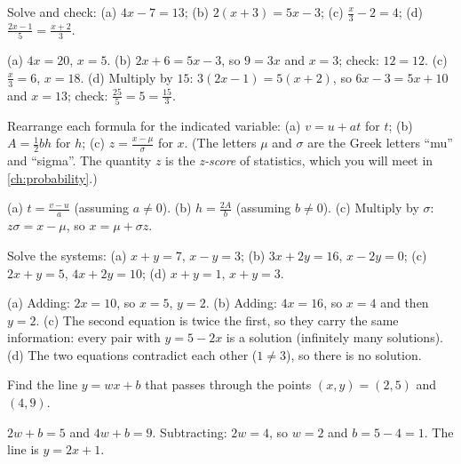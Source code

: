 \sectionexercises

\begin{exercise}
Solve and check: (a) $4x - 7 = 13$; (b) $2(x+3) = 5x - 3$;
(c) $\tfrac{x}{3} - 2 = 4$; (d) $\tfrac{2x-1}{5} = \tfrac{x+2}{3}$.
\end{exercise}
\begin{solution}
(a) $4x = 20$, $x = 5$.
(b) $2x + 6 = 5x - 3$, so $9 = 3x$ and $x = 3$; check: $12 = 12$.
(c) $\tfrac{x}{3} = 6$, $x = 18$.
(d) Multiply by $15$: $3(2x - 1) = 5(x + 2)$, so $6x - 3 = 5x + 10$ and
$x = 13$; check: $\tfrac{25}{5} = 5 = \tfrac{15}{3}$.
\end{solution}

\begin{exercise}
Rearrange each formula for the indicated variable: (a) $v = u + at$ for $t$;
(b) $A = \tfrac12 bh$ for $h$; (c) $z = \tfrac{x - \mu}{\sigma}$ for $x$.
(The letters $\mu$ and $\sigma$ are the Greek letters ``mu'' and ``sigma''.
The quantity $z$ is the \emph{z-score} of statistics, which you will meet in
\cref{ch:probability}.)
\end{exercise}
\begin{solution}
(a) $t = \tfrac{v - u}{a}$ (assuming $a \neq 0$).
(b) $h = \tfrac{2A}{b}$ (assuming $b \neq 0$).
(c) Multiply by $\sigma$: $z\sigma = x - \mu$, so $x = \mu + \sigma z$.
\end{solution}

\begin{exercise}
Solve the systems: (a) $x + y = 7$, $x - y = 3$; (b) $3x + 2y = 16$,
$x - 2y = 0$; (c) $2x + y = 5$, $4x + 2y = 10$; (d) $x + y = 1$,
$x + y = 3$.
\end{exercise}
\begin{solution}
(a) Adding: $2x = 10$, so $x = 5$, $y = 2$.
(b) Adding: $4x = 16$, so $x = 4$ and then $y = 2$.
(c) The second equation is twice the first, so they carry the same
information: every pair with $y = 5 - 2x$ is a solution (infinitely many
solutions).
(d) The two equations contradict each other ($1 \neq 3$), so there is no
solution.
\end{solution}

\begin{exercise}
Find the line $y = wx + b$ that passes through the points $(x,y) = (2,5)$ and
$(4,9)$.
\end{exercise}
\begin{solution}
$2w + b = 5$ and $4w + b = 9$. Subtracting: $2w = 4$, so $w = 2$ and
$b = 5 - 4 = 1$. The line is $y = 2x + 1$.
\end{solution}

